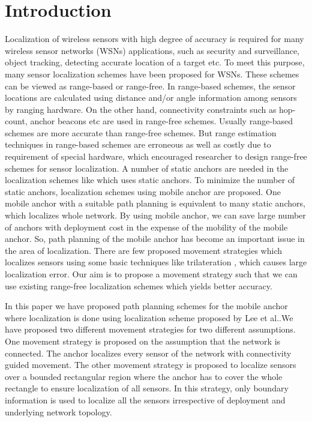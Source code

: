 \documentclass[preprint,11pt]{elsarticle}
\begin{document}
\section{Introduction}
\label{sec:intro}
Localization of wireless sensors with high degree of accuracy is required for many
wireless sensor networks (WSNs) applications, such as security and surveillance,
object tracking, detecting accurate location of a target etc.
To meet this purpose, many sensor localization schemes
\cite{Ammar2010,Chen2012,Delaet11,Lee2009,Seow:2008,Ssu2005,Xiao2008,zhang2006} have been proposed for WSNs.
These schemes can be viewed as range-based or range-free. In range-based schemes, the sensor locations
are calculated using distance and/or angle information among sensors by ranging hardware.
On the other hand, connectivity constraints such as hop-count, anchor beacons etc are used in range-free
schemes. Usually range-based schemes are more accurate than range-free schemes. But range estimation
techniques in range-based schemes are erroneous as well as costly due to requirement of special hardware,
which encouraged researcher to design range-free schemes for sensor localization.
A number of static anchors are needed in the localization schemes like \cite{Ammar2010,Chen2012,Delaet11,Seow:2008,zhang2006}
which uses static anchors.
To minimize the number of static anchors, localization schemes \cite{Lee2009,Ssu2005,Xiao2008} using mobile anchor are proposed.
One mobile anchor with a suitable path planning is equivalent to many static anchors,
which localizes whole network. By using mobile anchor, we can save large number of anchors with deployment cost
in the expense of the mobility of the mobile anchor. So, path planning of the mobile anchor has
become an important issue in the area of localization. There are few proposed movement strategies which localizes sensors using some basic
techniques like trilateration \cite{Shih2010}, which causes large localization error. Our aim is to
propose a movement strategy such that we can use existing range-free localization schemes which
yields better accuracy.

In this paper we have proposed path planning schemes for the mobile anchor where localization
is done using localization scheme proposed by Lee et al.\cite{Lee2009}.We have proposed two different movement strategies for two different assumptions.
One movement strategy is proposed on the assumption that the network is connected.
The anchor localizes every sensor of the network with connectivity guided movement.
The other movement strategy is proposed to localize sensors over a bounded rectangular
region where the anchor has to cover the whole rectangle to ensure localization of all sensors.
In this strategy, only boundary information is used to localize all the sensors irrespective of
deployment and underlying network topology.
\end{document}
